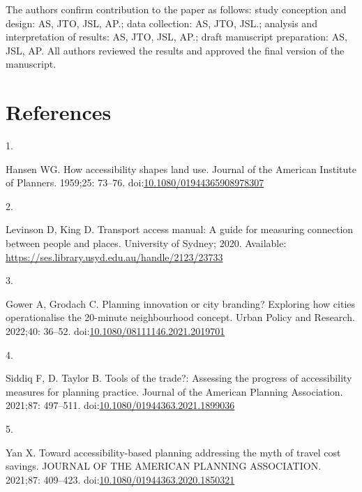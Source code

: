 \documentclass[10pt,letterpaper]{article}
\newlength{\cslhangindent}
\newlength{\csllabelwidth}
\newlength{\cslentryspacingunit} %
\newenvironment{CSLReferences}[2] %
 {%
  \setlength{\parindent}{0pt}
  \ifodd #1
  \let\oldpar\par
  \def\par{\hangindent=\cslhangindent\oldpar}
  \fi
  \setlength{\parskip}{#2\cslentryspacingunit}
 }%
 {}
\newcommand{\CSLLeftMargin}[1]{\parbox[t]{\csllabelwidth}{#1}}
\newcommand{\CSLRightInline}[1]{\parbox[t]{\linewidth - \csllabelwidth}{#1}\break}
\begin{document}
The authors confirm contribution to the paper as follows: study
conception and design: AS, JTO, JSL, AP.; data collection: AS, JTO,
JSL.; analysis and interpretation of results: AS, JTO, JSL, AP.; draft
manuscript preparation: AS, JSL, AP. All authors reviewed the results
and approved the final version of the manuscript.

\hypertarget{references}{%
\section*{References}\label{references}}

\hypertarget{refs}{}
\begin{CSLReferences}{0}{0}
\leavevmode{}%
\CSLLeftMargin{1. }%
\CSLRightInline{Hansen WG. How accessibility shapes land use. Journal of
the American Institute of Planners. 1959;25: 73--76.
doi:\href{https://doi.org/10.1080/01944365908978307}{10.1080/01944365908978307}}

\leavevmode{}%
\CSLLeftMargin{2. }%
\CSLRightInline{Levinson D, King D. Transport access manual: {A} guide
for measuring connection between people and places. {University of
Sydney}; 2020. Available:
\url{https://ses.library.usyd.edu.au/handle/2123/23733}}

\leavevmode{}%
\CSLLeftMargin{3. }%
\CSLRightInline{Gower A, Grodach C. Planning innovation or city
branding? Exploring how cities operationalise the 20-minute
neighbourhood concept. Urban Policy and Research. 2022;40: 36--52.
doi:\href{https://doi.org/10.1080/08111146.2021.2019701}{10.1080/08111146.2021.2019701}}

\leavevmode{}%
\CSLLeftMargin{4. }%
\CSLRightInline{Siddiq F, D. Taylor B. Tools of the trade?: Assessing
the progress of accessibility measures for planning practice. Journal of
the American Planning Association. 2021;87: 497--511.
doi:\href{https://doi.org/10.1080/01944363.2021.1899036}{10.1080/01944363.2021.1899036}}

\leavevmode{}%
\CSLLeftMargin{5. }%
\CSLRightInline{Yan X. Toward accessibility-based planning addressing
the myth of travel cost savings. {JOURNAL} {OF} {THE} {AMERICAN}
{PLANNING} {ASSOCIATION}. 2021;87: 409--423.
doi:\href{https://doi.org/10.1080/01944363.2020.1850321}{10.1080/01944363.2020.1850321}}


\end{CSLReferences}
\end{document}
